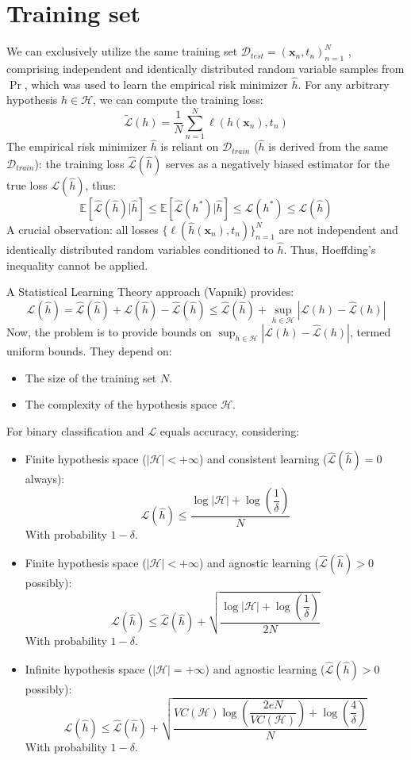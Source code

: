\section{Training set}

We can exclusively utilize the same training set $\mathcal{D}_{test} = {(\mathbf{x}_n , t_n )}_{n=1}^N$ , comprising independent and identically distributed random variable samples from $\Pr$, which was used to learn the empirical risk minimizer $\hat{h}$.
For any arbitrary hypothesis $h\in\mathcal{H}$, we can compute the training loss:
\[\tilde{\mathcal{L}}(h)=\dfrac{1}{N}\sum_{n=1}^{N}\ell(h(\mathbf{x}_n),t_n)\]
The empirical risk minimizer $\hat{h}$ is reliant on $\mathcal{D}_{train}$ ($\hat{h}$ is derived from the same $\mathcal{D}_{train}$): the training loss $\hat{\mathcal{L}}(\hat{h})$  serves as a negatively biased estimator for the true loss $\mathcal{L}(\hat{h})$, thus:
\[\mathbb{E}[\hat{\mathcal{L}}(\hat{h})|\hat{h}]\leq\mathbb{E}[\hat{\mathcal{L}}(h^\ast)|\hat{h}]\leq\mathcal{L}(h^\ast)\leq\mathcal{L}(\hat{h})\]
A crucial observation: all losses $\{\ell(\hat{h}(\mathbf{x}_n), t_n)\}^N_{n=1}$ are not independent and identically distributed random variables conditioned to $\hat{h}$. 
Thus, Hoeffding's inequality cannot be applied.

A Statistical Learning Theory approach (Vapnik) provides:
\[\mathcal{L}(\hat{h})=\hat{\mathcal{L}}(\hat{h})+\mathcal{L}(\hat{h})-\hat{\mathcal{L}}(\hat{h})\leq\hat{\mathcal{L}}(\hat{h})+\sup_{h\in\mathcal{H}}\left\lvert \mathcal{L}(h)-\hat{\mathcal{L}}(h)\right\rvert \]
Now, the problem is to provide bounds on $\sup_{h\in\mathcal{H}}\left\lvert \mathcal{L}(h)-\hat{\mathcal{L}}(h)\right\rvert$, termed uniform bounds. 
They depend on:
\begin{itemize}
    \item The size of the training set $N$. 
    \item The complexity of the hypothesis space $\mathcal{H}$.
\end{itemize}
For binary classification and $\mathcal{L}$ equals accuracy, considering:
\begin{itemize}
    \item Finite hypothesis space ($\left\lvert \mathcal{H}\right\rvert<+\infty$) and consistent learning ($\hat{\mathcal{L}}(\hat{h}) = 0$ always):
        \[\mathcal{L}(\hat{h})\leq\dfrac{\log\left\lvert \mathcal{H}\right\rvert+\log\left(\dfrac{1}{\delta}\right)}{N}\] 
        With probability $1-\delta$.
    \item Finite hypothesis space ($\left\lvert \mathcal{H}\right\rvert<+\infty$) and agnostic learning ($\hat{\mathcal{L}}(\hat{h}) > 0$ possibly): 
        \[\mathcal{L}(\hat{h})\leq\hat{\mathcal{L}}(\hat{h})+\sqrt{\dfrac{\log\left\lvert \mathcal{H}\right\rvert+\log\left(\dfrac{1}{\delta}\right)}{2N}}\] 
        With probability $1-\delta$.
    \item Infinite hypothesis space ($\left\lvert \mathcal{H}\right\rvert=+\infty$) and agnostic learning ($\hat{\mathcal{L}}(\hat{h}) > 0$ possibly):
        \[\mathcal{L}(\hat{h})\leq\hat{\mathcal{L}}(\hat{h})+\sqrt{\dfrac{VC(\mathcal{H})\log\left(\dfrac{2eN}{VC(\mathcal{H})}\right)+\log\left(\dfrac{4}{\delta}\right)}{N}}\] 
        With probability $1-\delta$. 
\end{itemize}